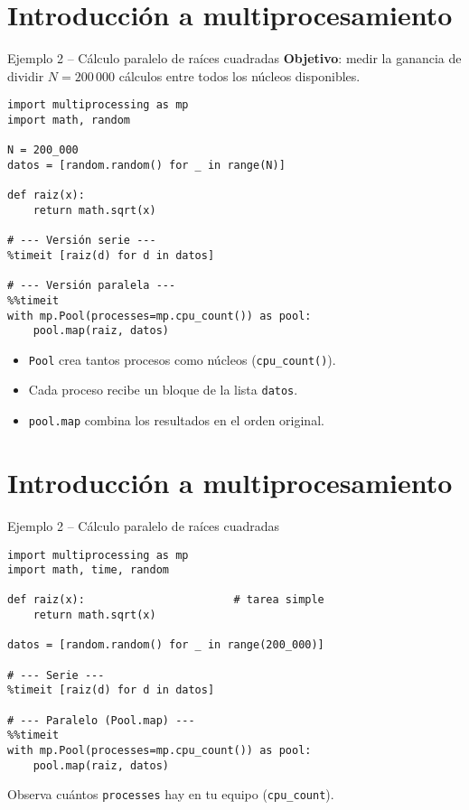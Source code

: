 \documentclass[10pt]{beamer}
\begin{document}
\section{Introducción a multiprocesamiento}

\begin{frame}[fragile]{Ejemplo 2 – Cálculo paralelo de raíces cuadradas}
\textbf{Objetivo}: medir la ganancia de dividir \(N=200\,000\) cálculos entre
todos los núcleos disponibles.

\begin{verbatim}
import multiprocessing as mp
import math, random

N = 200_000
datos = [random.random() for _ in range(N)]

def raiz(x):
    return math.sqrt(x)

# --- Versión serie ---
%timeit [raiz(d) for d in datos]

# --- Versión paralela ---
%%timeit
with mp.Pool(processes=mp.cpu_count()) as pool:
    pool.map(raiz, datos)
\end{verbatim}

\begin{itemize}
  \item \texttt{Pool} crea tantos procesos como núcleos (\texttt{cpu\_count()}).
  \item Cada proceso recibe un bloque de la lista \texttt{datos}.  
  \item \texttt{pool.map} combina los resultados en el orden original.
\end{itemize}
\end{frame}



\section{Introducción a multiprocesamiento}
\begin{frame}[fragile]{Ejemplo 2 – Cálculo paralelo de raíces cuadradas}
\begin{verbatim}
import multiprocessing as mp
import math, time, random

def raiz(x):                       # tarea simple
    return math.sqrt(x)

datos = [random.random() for _ in range(200_000)]

# --- Serie ---
%timeit [raiz(d) for d in datos]

# --- Paralelo (Pool.map) ---
%%timeit
with mp.Pool(processes=mp.cpu_count()) as pool:
    pool.map(raiz, datos)
\end{verbatim}

\small
Observa cuántos \texttt{processes} hay en tu equipo (\texttt{cpu\_count}).
\end{frame}
\end{document}
